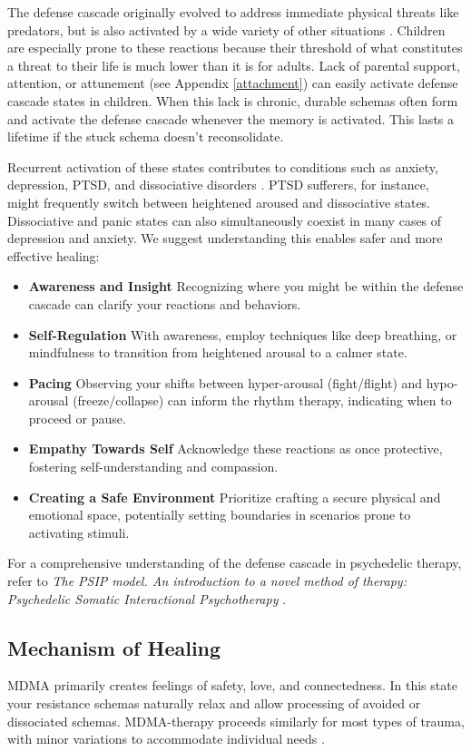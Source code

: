 \documentclass[12pt,letterpaper]{article}
\begin{document}
The defense cascade originally evolved to address immediate physical threats like predators, but is also activated by a wide variety of other situations \cite{razviPSIP}. Children are especially prone to these reactions because their threshold of what constitutes a threat to their life is much lower than it is for adults. Lack of parental support, attention, or attunement (see Appendix \ref{attachment}) can easily activate defense cascade states in children. When this lack is chronic, durable schemas often form and activate the defense cascade whenever the memory is activated. This lasts a lifetime if the stuck schema doesn't reconsolidate.

Recurrent activation of these states contributes to conditions such as anxiety, depression, PTSD, and dissociative disorders \cite{razviPSIP}. PTSD sufferers, for instance, might frequently switch between heightened aroused and dissociative states. Dissociative and panic states can also simultaneously coexist in many cases of depression and anxiety. We suggest understanding this enables safer and more effective healing: 
\begin{itemize}
    \item \textbf{Awareness and Insight} Recognizing where you might be within the defense cascade can clarify your reactions and behaviors.
    \item \textbf{Self-Regulation} With awareness, employ techniques like deep breathing, or mindfulness to transition from heightened arousal to a calmer state.
    \item \textbf{Pacing} Observing your shifts between hyper-arousal (fight/flight) and hypo-arousal (freeze/collapse) can inform the rhythm therapy, indicating when to proceed or pause.
    \item \textbf{Empathy Towards Self} Acknowledge these reactions as once protective, fostering self-understanding and compassion.
    \item \textbf{Creating a Safe Environment} Prioritize crafting a secure physical and emotional space, potentially setting boundaries in scenarios prone to activating stimuli.
\end{itemize}

For a comprehensive understanding of the defense cascade in psychedelic therapy, refer to \textit{The PSIP model. An introduction to a novel method of therapy: Psychedelic Somatic Interactional Psychotherapy} \cite{razviPSIP}.
\subsection{Mechanism of Healing}
MDMA primarily creates feelings of safety, love, and connectedness. In this state your resistance schemas naturally relax and allow processing of avoided or dissociated schemas. MDMA-therapy proceeds similarly for most types of trauma, with minor variations to accommodate individual needs \cite{otaloraMDMA}. 
\end{document}
